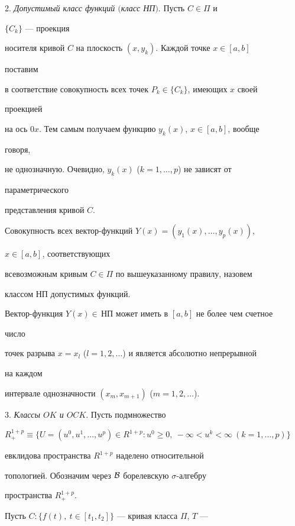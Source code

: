 2. {\it Допустимый класс функций $($класс НП$)$}. Пусть $C\in\Pi$ и 


$\{C_k\}$ --- проекция 


носителя кривой $C$ на плоскость $(x,y_k)$. Каждой точке $x\in[a,b]$ 


поставим 


в соответствие совокупность всех точек $P_k\in\{C_k\}$, имеющих $x$ своей 


проекцией 


на ось $0x$. Тем самым получаем функцию $y_k(x)$, $x\in[a,b]$, вообще 


говоря, 


не однозначную. Очевидно, $y_k(x)$ ($k=1,\dotsc,p$) не зависят от 


параметрического 


представления кривой $C$. 


 


Совокупность всех вектор-функций $Y(x)=(y_1(x),\dotsc,y_p(x))$, 


$x\in[a,b]$, соответствующих 


всевозможным кривым $C\in\Pi$ по вышеуказанному правилу, назовем 


классом НП допустимых функций. 


 


Вектор-функция $Y(x)\in\,$НП может иметь в $[a,b]$ не более чем счетное 


число 


точек разрыва $x=x_l$ ($l=1,2,\dotsc$) и является абсолютно непрерывной 


на каждом 


интервале однозначности $(x_m,x_{m+1})$ ($m=1,2,\dotsc$). 


 


3. {\it Классы $OK$ и $OCK$}. Пусть подмножество 


$R^{1+p}_+\equiv\{U=(u^0,u^1,\dotsc,u^p)\in R^{1+p}: u^0\ge0,\ 


-\infty<u^k<\infty\ (k=1,\dotsc,p)\}$ 


евклидова пространства $R^{1+p}$ наделено относительной 


топологией. Обозначим через $\cal B$ борелевскую $\sigma$-алгебру 


пространства $R^{1+p}_+$. 


 


Пусть $C:\{f(t),\ t\in[t_1,t_2]\}$ --- кривая класса $\Pi$, $T$ --- 


